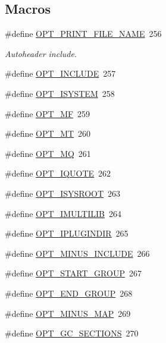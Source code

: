 \subsection*{Macros}
\begin{DoxyCompactItemize}
\item 
\#define \hyperlink{tree-panda-gcc-Parameter_8cpp_a30d5749c30fddf3f49d429641e1c99a4}{O\+P\+T\+\_\+\+P\+R\+I\+N\+T\+\_\+\+F\+I\+L\+E\+\_\+\+N\+A\+ME}~256
\begin{DoxyCompactList}\small\item\em Autoheader include. \end{DoxyCompactList}\item 
\#define \hyperlink{tree-panda-gcc-Parameter_8cpp_a1528d5c9f1ddc3b6fa17855fd341a641}{O\+P\+T\+\_\+\+I\+N\+C\+L\+U\+DE}~257
\item 
\#define \hyperlink{tree-panda-gcc-Parameter_8cpp_a763b9181d532df05a59371515aca52a1}{O\+P\+T\+\_\+\+I\+S\+Y\+S\+T\+EM}~258
\item 
\#define \hyperlink{tree-panda-gcc-Parameter_8cpp_aac067fad8b4c6f0939d40d8f3b8e1e41}{O\+P\+T\+\_\+\+MF}~259
\item 
\#define \hyperlink{tree-panda-gcc-Parameter_8cpp_aadb4992d56719fca8a312d940ade8ee1}{O\+P\+T\+\_\+\+MT}~260
\item 
\#define \hyperlink{tree-panda-gcc-Parameter_8cpp_a1e92ebb5e73a8386db8ecb3aae46879b}{O\+P\+T\+\_\+\+MQ}~261
\item 
\#define \hyperlink{tree-panda-gcc-Parameter_8cpp_a0bfd05786a9779fe8d9687ec5311e50d}{O\+P\+T\+\_\+\+I\+Q\+U\+O\+TE}~262
\item 
\#define \hyperlink{tree-panda-gcc-Parameter_8cpp_a60678130d4b7aef1cd244526d69677f5}{O\+P\+T\+\_\+\+I\+S\+Y\+S\+R\+O\+OT}~263
\item 
\#define \hyperlink{tree-panda-gcc-Parameter_8cpp_adfa0dbcb390121d31f82fbed8291c2c0}{O\+P\+T\+\_\+\+I\+M\+U\+L\+T\+I\+L\+IB}~264
\item 
\#define \hyperlink{tree-panda-gcc-Parameter_8cpp_ae943775a5d954284949c24baf8d1400a}{O\+P\+T\+\_\+\+I\+P\+L\+U\+G\+I\+N\+D\+IR}~265
\item 
\#define \hyperlink{tree-panda-gcc-Parameter_8cpp_a44ab469287d27e943f76db35d2ee0f21}{O\+P\+T\+\_\+\+M\+I\+N\+U\+S\+\_\+\+I\+N\+C\+L\+U\+DE}~266
\item 
\#define \hyperlink{tree-panda-gcc-Parameter_8cpp_af4da3407ef6e89db0b706f9f3646039f}{O\+P\+T\+\_\+\+S\+T\+A\+R\+T\+\_\+\+G\+R\+O\+UP}~267
\item 
\#define \hyperlink{tree-panda-gcc-Parameter_8cpp_ac8b792761d04eb5e8c358b8f3ab5ad7f}{O\+P\+T\+\_\+\+E\+N\+D\+\_\+\+G\+R\+O\+UP}~268
\item 
\#define \hyperlink{tree-panda-gcc-Parameter_8cpp_a67243a9e94e9a8cfba46fab0f33bda54}{O\+P\+T\+\_\+\+M\+I\+N\+U\+S\+\_\+\+M\+AP}~269
\item 
\#define \hyperlink{tree-panda-gcc-Parameter_8cpp_a718a40dcf30556711fa110189c97aba5}{O\+P\+T\+\_\+\+G\+C\+\_\+\+S\+E\+C\+T\+I\+O\+NS}~270
\end{DoxyCompactItemize}



